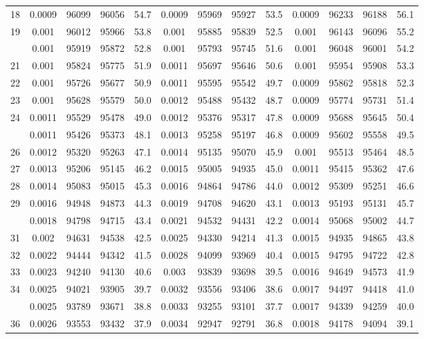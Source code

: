 \documentclass[
  14pt,
]{article}
\begin{document}
\begin{longtable}[t]{lcccccccccccc}
18 & 0.0009 & 96099 & 96056 & 54.7 & 0.0009 & 95969 & 95927 & 53.5 & 0.0009 & 96233 & 96188 & 56.1\\
19 & 0.001 & 96012 & 95966 & 53.8 & 0.001 & 95885 & 95839 & 52.5 & 0.001 & 96143 & 96096 & 55.2\\
\addlinespace
20 & 0.001 & 95919 & 95872 & 52.8 & 0.001 & 95793 & 95745 & 51.6 & 0.001 & 96048 & 96001 & 54.2\\
21 & 0.001 & 95824 & 95775 & 51.9 & 0.0011 & 95697 & 95646 & 50.6 & 0.001 & 95954 & 95908 & 53.3\\
22 & 0.001 & 95726 & 95677 & 50.9 & 0.0011 & 95595 & 95542 & 49.7 & 0.0009 & 95862 & 95818 & 52.3\\
23 & 0.001 & 95628 & 95579 & 50.0 & 0.0012 & 95488 & 95432 & 48.7 & 0.0009 & 95774 & 95731 & 51.4\\
24 & 0.0011 & 95529 & 95478 & 49.0 & 0.0012 & 95376 & 95317 & 47.8 & 0.0009 & 95688 & 95645 & 50.4\\
\addlinespace
25 & 0.0011 & 95426 & 95373 & 48.1 & 0.0013 & 95258 & 95197 & 46.8 & 0.0009 & 95602 & 95558 & 49.5\\
26 & 0.0012 & 95320 & 95263 & 47.1 & 0.0014 & 95135 & 95070 & 45.9 & 0.001 & 95513 & 95464 & 48.5\\
27 & 0.0013 & 95206 & 95145 & 46.2 & 0.0015 & 95005 & 94935 & 45.0 & 0.0011 & 95415 & 95362 & 47.6\\
28 & 0.0014 & 95083 & 95015 & 45.3 & 0.0016 & 94864 & 94786 & 44.0 & 0.0012 & 95309 & 95251 & 46.6\\
29 & 0.0016 & 94948 & 94873 & 44.3 & 0.0019 & 94708 & 94620 & 43.1 & 0.0013 & 95193 & 95131 & 45.7\\
\addlinespace
30 & 0.0018 & 94798 & 94715 & 43.4 & 0.0021 & 94532 & 94431 & 42.2 & 0.0014 & 95068 & 95002 & 44.7\\
31 & 0.002 & 94631 & 94538 & 42.5 & 0.0025 & 94330 & 94214 & 41.3 & 0.0015 & 94935 & 94865 & 43.8\\
32 & 0.0022 & 94444 & 94342 & 41.5 & 0.0028 & 94099 & 93969 & 40.4 & 0.0015 & 94795 & 94722 & 42.8\\
33 & 0.0023 & 94240 & 94130 & 40.6 & 0.003 & 93839 & 93698 & 39.5 & 0.0016 & 94649 & 94573 & 41.9\\
34 & 0.0025 & 94021 & 93905 & 39.7 & 0.0032 & 93556 & 93406 & 38.6 & 0.0017 & 94497 & 94418 & 41.0\\
\addlinespace
35 & 0.0025 & 93789 & 93671 & 38.8 & 0.0033 & 93255 & 93101 & 37.7 & 0.0017 & 94339 & 94259 & 40.0\\
36 & 0.0026 & 93553 & 93432 & 37.9 & 0.0034 & 92947 & 92791 & 36.8 & 0.0018 & 94178 & 94094 & 39.1\\

\end{longtable}
\end{document}
